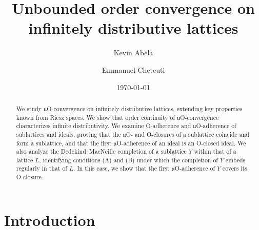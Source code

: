 \documentclass[12pt,a4paper]{amsart}
\numberwithin{equation}{section}
\theoremstyle{definition}
\begin{document}
	\title{Unbounded order convergence on infinitely distributive lattices}
	
	\author{Kevin Abela}
	\address{Kevin Abela \\ Department of Mathematics \\Faculty of Science \\University of Malta \\Msida MSD 2080, Malta} 
	
	\author{Emmanuel Chetcuti}
	\address{Emmanuel Chetcuti\\Department of Mathematics\\Faculty of Science\\University of Malta\\Msida MSD 2080  Malta} 
	
	
	\date{\today}
	


\begin{abstract}
We study $\mathfrak{u}$O-convergence on infinitely distributive lattices, extending key properties known from Riesz spaces. We show that order continuity of $\mathfrak{u}$O-convergence characterizes infinite distributivity. We examine O-adherence and $\mathfrak{u}$O-adherence of sublattices and ideals, proving that the $\mathfrak{u}$O- and O-closures of a sublattice coincide and form a sublattice, and that the first $\mathfrak{u}$O-adherence of an ideal is an O-closed ideal. We also analyze the Dedekind–MacNeille completion of a sublattice $Y$ within that of a lattice $L$, identifying conditions (A) and (B) under which the completion of $Y$ embeds regularly in that of $L$. In this case, we show that the first $\mathfrak{u}$O-adherence of $Y$ covers its O-closure.
\end{abstract}

\maketitle


\section{Introduction}
\end{document}

